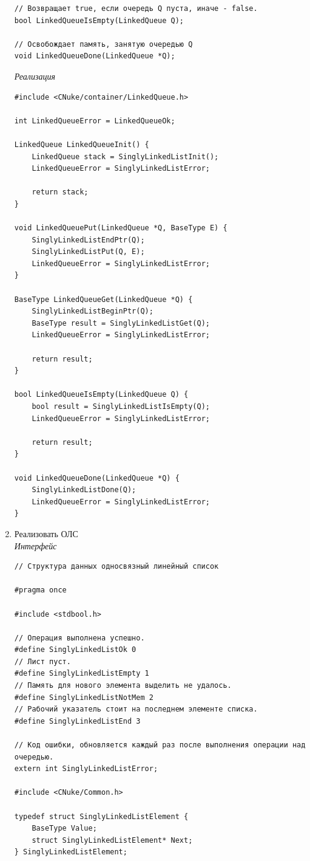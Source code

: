\documentclass[a4paper,14pt]{extarticle}
\begin{document}
\begin{enumerate}
\begin{verbatim}
// Возвращает true, если очередь Q пуста, иначе - false.
bool LinkedQueueIsEmpty(LinkedQueue Q);

// Освобождает память, занятую очередью Q
void LinkedQueueDone(LinkedQueue *Q);
    \end{verbatim}
    \textit{Реализация}
\begin{verbatim}
#include <CNuke/container/LinkedQueue.h>

int LinkedQueueError = LinkedQueueOk;

LinkedQueue LinkedQueueInit() {
    LinkedQueue stack = SinglyLinkedListInit();
    LinkedQueueError = SinglyLinkedListError;
    
    return stack;
}

void LinkedQueuePut(LinkedQueue *Q, BaseType E) {
    SinglyLinkedListEndPtr(Q);
    SinglyLinkedListPut(Q, E);
    LinkedQueueError = SinglyLinkedListError;
}

BaseType LinkedQueueGet(LinkedQueue *Q) {
    SinglyLinkedListBeginPtr(Q);
    BaseType result = SinglyLinkedListGet(Q);
    LinkedQueueError = SinglyLinkedListError;

    return result;
}

bool LinkedQueueIsEmpty(LinkedQueue Q) {
    bool result = SinglyLinkedListIsEmpty(Q);
    LinkedQueueError = SinglyLinkedListError;

    return result;
}

void LinkedQueueDone(LinkedQueue *Q) {
    SinglyLinkedListDone(Q);
    LinkedQueueError = SinglyLinkedListError;
}
    \end{verbatim}
    \item Реализовать ОЛС\\
	\textit{Интерфейс}
    \begin{verbatim}
// Структура данных односвязный линейный список

#pragma once

#include <stdbool.h>

// Операция выполнена успешно.
#define SinglyLinkedListOk 0
// Лист пуст.
#define SinglyLinkedListEmpty 1
// Память для нового элемента выделить не удалось.
#define SinglyLinkedListNotMem 2
// Рабочий указатель стоит на последнем элементе списка.
#define SinglyLinkedListEnd 3

// Код ошибки, обновляется каждый раз после выполнения операции над очередью.
extern int SinglyLinkedListError;

#include <CNuke/Common.h>

typedef struct SinglyLinkedListElement {
    BaseType Value;
    struct SinglyLinkedListElement* Next;
} SinglyLinkedListElement;


\end{verbatim}
\end{enumerate}
\end{document}
